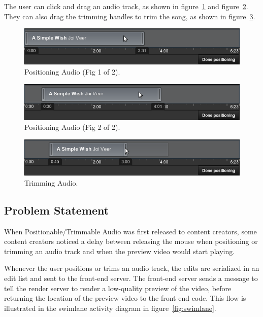 \documentclass[se,resubmit]{uw-wkrpt}
\begin{document}
The user can click and drag an audio track, as shown in
figure~\ref{fig:position-drag-start} and
figure~\ref{fig:position-drag-end}. They can also drag the trimming handles
to trim the song, as shown in figure~\ref{fig:trim}.

\begin{figure}
  \centering
  \includegraphics[width=6.25in]{position-drag-start}
  \caption{Positioning Audio (Fig 1 of 2).}
  \label{fig:position-drag-start}
\end{figure}

\begin{figure}
  \centering
  \includegraphics[width=6.25in]{position-drag-end}
  \caption{Positioning Audio (Fig 2 of 2).}
  \label{fig:position-drag-end}
\end{figure}

\begin{figure}
  \centering
  \includegraphics[width=6.25in]{trim}
  \caption{Trimming Audio.}
  \label{fig:trim}
\end{figure}


\subsection{Problem Statement}\label{sec:problem}
When Positionable/Trimmable Audio was first released to content creators,
some content creators noticed a delay between releasing the mouse when
positioning or trimming an audio track and when the preview video would
start playing.

Whenever the user positions or trims an audio track, the edits are
serialized in an edit list and sent to the front-end server. The front-end
server sends a message to tell the render server to render a low-quality
preview of the video, before returning the location of the preview video to
the front-end code. This flow is illustrated in the swimlane activity
diagram in figure~\ref{fig:swimlane}.
\end{document}
